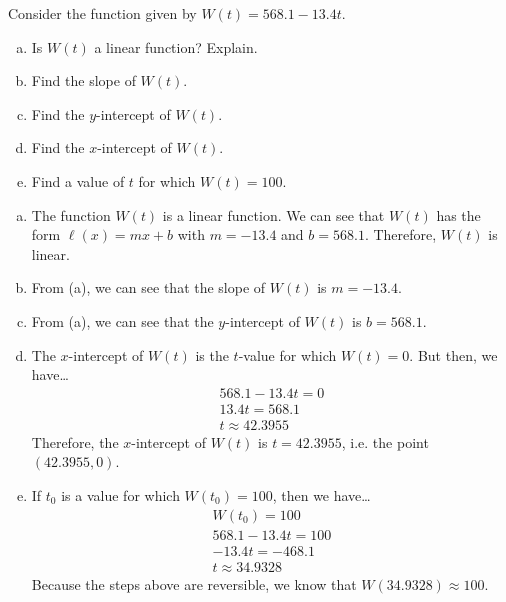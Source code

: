 \documentclass[11pt,letterpaper]{article}
\begin{document}

 Consider the function given by $W(t)= 568.1 - 13.4t$. 
	\begin{enumerate}[(a)]
	\item Is $W(t)$ a linear function? Explain.
	\item Find the slope of $W(t)$.
	\item Find the $y$-intercept of $W(t)$.
	\item Find the $x$-intercept of $W(t)$. 
	\item Find a value of $t$ for which $W(t)= 100$. 
	\end{enumerate} \pspace

\sol 
\begin{enumerate}[(a)]
\item The function $W(t)$ is a linear function. We can see that $W(t)$ has the form $\ell(x)= mx + b$ with $m= -13.4$ and $b= 568.1$. Therefore, $W(t)$ is linear. \pspace

\item From (a), we can see that the slope of $W(t)$ is $m= -13.4$. \pspace

\item From (a), we can see that the $y$-intercept of $W(t)$ is $b= 568.1$. \pspace

\item The $x$-intercept of $W(t)$ is the $t$-value for which $W(t)= 0$. But then, we have\dots
	\[
	\begin{gathered}
	568.1 - 13.4t= 0 \\
	13.4t= 568.1 \\
	t \approx 42.3955
	\end{gathered}
	\]
Therefore, the $x$-intercept of $W(t)$ is $t= 42.3955$, i.e. the point $(42.3955, 0)$. \pspace

\item If $t_0$ is a value for which $W(t_0)= 100$, then we have\dots
	\[
	\begin{gathered}
	W(t_0)= 100 \\
	568.1 - 13.4t= 100 \\
	-13.4t= -468.1 \\
	t \approx  34.9328
	\end{gathered}
	\]
Because the steps above are reversible, we know that $W(34.9328) \approx 100$. 
\end{enumerate}
\end{document}
